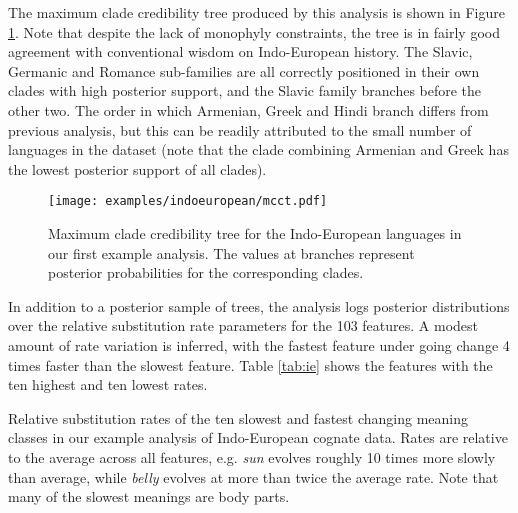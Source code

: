 \documentclass[twocolumn,10pt]{scrartcl}
\begin{document}
The maximum clade credibility tree produced by this analysis is shown in Figure \ref{fig:ie}.  Note that despite the lack of monophyly constraints, the tree is in fairly good agreement with conventional wisdom on Indo-European history.  The Slavic, Germanic and Romance sub-families are all correctly positioned in their own clades with high posterior support, and the Slavic family branches before the other two.  The order in which Armenian, Greek and Hindi branch differs from previous analysis\cite{Gray2003,Bouckaert2012}, but this can be readily attributed to the small number of languages in the dataset (note that the clade combining Armenian and Greek has the lowest posterior support of all clades).

\begin{figure}[t]
	\begin{center}
	\texttt{[image: examples/indoeuropean/mcct.pdf]}
	\end{center}
	\caption{Maximum clade credibility tree for the Indo-European languages in our first example analysis.  The values at branches represent posterior probabilities for the corresponding clades.}
\label{fig:ie}
\end{figure}

In addition to a posterior sample of trees, the analysis logs posterior distributions over the relative substitution rate parameters for the 103 features.  A modest amount of rate variation is inferred, with the fastest feature under going change 4 times faster than the slowest feature.  Table \ref{tab:ie} shows the features with the ten highest and ten lowest rates.  
\begin{table}[t]
	\begin{center}
		
	\end{center}
	\caption{Relative substitution rates of the ten slowest and fastest changing meaning classes in our example analysis of Indo-European cognate data.  Rates are relative to the average across all features, e.g. \emph{sun} evolves roughly 10 times more slowly than average, while \emph{belly} evolves at more than twice the average rate.  Note that many of the slowest meanings are body parts.}
\label{tab:ie}
\end{table}
\end{document}

